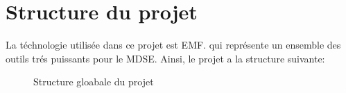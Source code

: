 \section{Structure du projet}

La téchnologie utilisée dans ce projet est EMF. qui représente un
ensemble des outils trés puissants pour le MDSE. Ainsi, le projet a la structure suivante:

\begin{figure}[H]
  \begin{center}
      \caption{Structure gloabale du projet}
  \end{center}
\end{figure}
